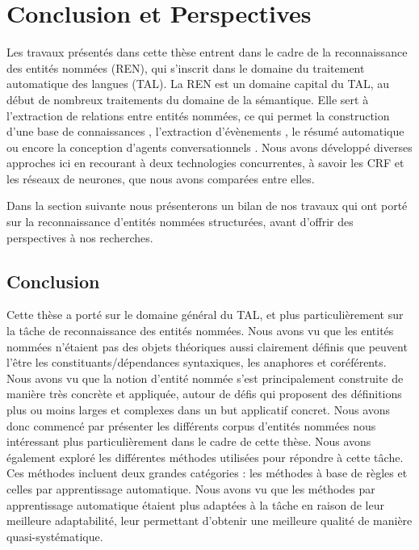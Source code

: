 \documentclass[12pt,a4paper,times,twoside,openright]{report}
\begin{document}
\chapter{Conclusion et Perspectives}
\label{chap:conclusion-and-perspectives}

Les travaux présentés dans cette thèse entrent dans le cadre de la reconnaissance des entités nommées (REN), qui s'inscrit dans le domaine du traitement automatique des langues (TAL). La REN est un domaine capital du TAL, au début de nombreux traitements du domaine de la sémantique. Elle sert à l'extraction de relations entre entités nommées, ce qui permet la construction d'une base de connaissances \citep{surdeanu2014overview,rahman2017tac}, l'extraction d'évènements \citep{kumaran2004text}, le résumé automatique \citep{nobata2002summarization,spitz2016terms} ou encore la conception d'agents conversationnels \citep{cahn2017chatbot}. Nous avons développé diverses approches ici en recourant à deux technologies concurrentes, à savoir les CRF et les réseaux de neurones, que nous avons comparées entre elles.

Dans la section suivante nous présenterons un bilan de nos travaux qui ont porté sur la reconnaissance d'entités nommées structurées, avant d'offrir des perspectives à nos recherches.

\section{Conclusion}
\label{sec:phd-conclusion}
Cette thèse a porté sur le domaine général du TAL, et plus particulièrement sur la tâche de reconnaissance des entités nommées. Nous avons vu que les entités nommées n'étaient pas des objets théoriques aussi clairement définis que peuvent l'être les constituants/dépendances syntaxiques, les anaphores et coréférents. Nous avons vu que la notion d'entité nommée s'est principalement construite de manière très concrète et appliquée, autour de défis qui proposent des définitions plus ou moins larges et complexes dans un but applicatif concret. Nous avons donc commencé par présenter les différents corpus d'entités nommées nous intéressant plus particulièrement dans le cadre de cette thèse. Nous avons également exploré les différentes méthodes utilisées pour répondre à cette tâche. Ces méthodes incluent deux grandes catégories : les méthodes à base de règles et celles par apprentissage automatique. Nous avons vu que les méthodes par apprentissage automatique étaient plus adaptées à la tâche en raison de leur meilleure adaptabilité, leur permettant d'obtenir une meilleure qualité de manière quasi-systématique.
\end{document}
